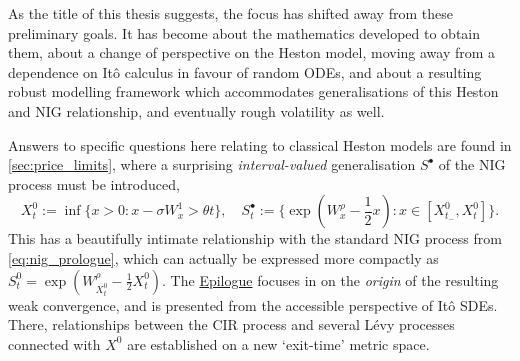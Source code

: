 As the title of this thesis suggests, the focus has shifted away from these preliminary goals. It has become about the mathematics developed to obtain them, about a change of perspective on the Heston model, moving away from a dependence on It\^o calculus in favour of random ODEs, and about a resulting robust modelling framework which accommodates generalisations of this Heston and NIG relationship, and eventually rough volatility as well.

Answers to specific questions here relating to classical Heston models are found in \autoref{sec:price_limits}, where a surprising \emph{interval-valued} generalisation $S^\bullet$ of the NIG process must be introduced,~
\begin{equation}\label{eq:ex_nig_pro}
    X^0_t:=\inf\bigg\{x>0:x-\sigma W^1_x > \theta t\bigg\},\quad S^\bullet_t := \bigg\{\exp\left(W^\rho_x - \frac12 x\right) : x\in[X^0_{t_-},X^0_t] \bigg\}.
\end{equation}
This has a beautifully intimate relationship with the standard NIG process from \autoref{eq:nig_prologue}, which can actually be expressed more compactly as $S^0_t = \exp(W^\rho_{X^0_t} - \frac12 X^0_t)$. The \hyperlink{epilogue}{Epilogue} focuses in on the \emph{origin} of the resulting weak convergence, and is presented from the accessible perspective of It\^o SDEs. There, relationships between the CIR process and several L\'evy processes connected with $X^0$ are established on a new `exit-time' metric space.
